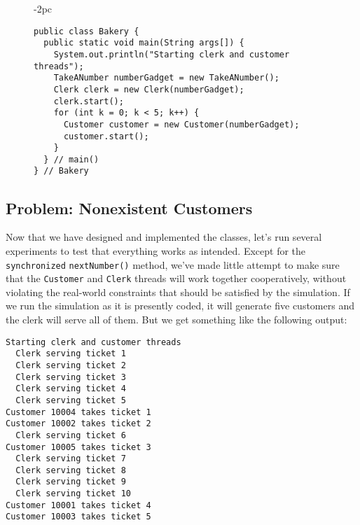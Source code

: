 \begin{figure}[h!]
\jjjprogstart
\begin{jjjlistingleft}[28pc]{-2pc}
\begin{lstlisting}
public class Bakery {
  public static void main(String args[]) {
    System.out.println("Starting clerk and customer threads");
    TakeANumber numberGadget = new TakeANumber();
    Clerk clerk = new Clerk(numberGadget);
    clerk.start();
    for (int k = 0; k < 5; k++) {
      Customer customer = new Customer(numberGadget);
      customer.start();
    }
  } // main()
} // Bakery
\end{lstlisting}
\end{jjjlistingleft}
\end{figure}

\subsection*{Problem: Nonexistent Customers}
\noindent Now that we have designed and implemented the classes, let's run
several experiments to test that everything works as intended.  Except
for the {\tt synchronized} {\tt nextNumber()} method, we've made
little attempt to make sure that the {\tt Customer} and {\tt Clerk}
threads will work together cooperatively, without violating the
real-world constraints that should be satisfied by the simulation.   If
we run the simulation as it is presently coded, it will generate five
customers and the clerk will serve all of them.  But we get something
like the following output:


\begin{jjjlisting}
\begin{lstlisting}
Starting clerk and customer threads
  Clerk serving ticket 1
  Clerk serving ticket 2
  Clerk serving ticket 3
  Clerk serving ticket 4
  Clerk serving ticket 5
Customer 10004 takes ticket 1
Customer 10002 takes ticket 2
  Clerk serving ticket 6
Customer 10005 takes ticket 3
  Clerk serving ticket 7
  Clerk serving ticket 8
  Clerk serving ticket 9
  Clerk serving ticket 10
Customer 10001 takes ticket 4
Customer 10003 takes ticket 5
\end{lstlisting}
\end{jjjlisting}

